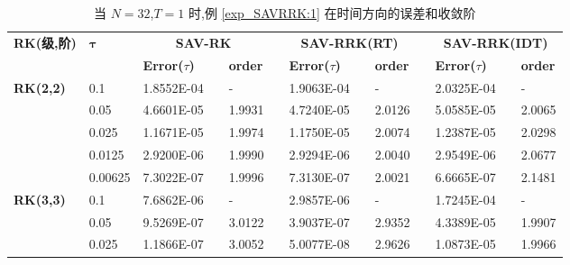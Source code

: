 \documentclass[aspectratio=169]{beamer}
\numberwithin{theorem}{section} %
\begin{document}
\begin{frame}%

	\begin{table}[H]\scriptsize
		\centering
		\caption{当 $N=32$,$T = 1$ 时,例 \ref{exp_SAVRRK:1} 在时间方向的误差和收敛阶}
		\begin{tabular}{lllllrlrlrlrlrl}
		\toprule
		\multicolumn{2}{l}{\multirow{2}[3]{*}{\textbf{RK(级,阶)}}} & \multicolumn{2}{l}{\multirow{2}[3]{*}{$\bm{\tau}$}} & \multicolumn{3}{c}{\textbf{SAV-RK}} &       & \multicolumn{3}{c}{\textbf{SAV-RRK(RT)}} &       & \multicolumn{3}{c}{\textbf{SAV-RRK(IDT)}} \\
		\cmidrule{5-7}\cmidrule{9-11}\cmidrule{13-15}    \multicolumn{2}{l}{} & \multicolumn{2}{l}{} & \textbf{Error($\tau$)} &       & \textbf{order} &       & \textbf{Error($\tau$)} &       & \textbf{order} &       & \textbf{Error($\tau$)} &       & \textbf{order} \\
		\hline
		\multicolumn{2}{l}{\multirow{5}[0]{*}{\textbf{RK(2,2)}}} & \multicolumn{2}{l}{0.1} & 1.8552E-04 &       & -     &       & 1.9063E-04 &       & -     &       & 2.0325E-04 &       & - \\
		\multicolumn{2}{l}{} & \multicolumn{2}{l}{0.05} & 4.6601E-05 &       & 1.9931  &       & 4.7240E-05 &       & 2.0126  &       & 5.0585E-05 &       & 2.0065  \\
		\multicolumn{2}{l}{} & \multicolumn{2}{l}{0.025} & 1.1671E-05 &       & 1.9974  &       & 1.1750E-05 &       & 2.0074  &       & 1.2387E-05 &       & 2.0298  \\
		\multicolumn{2}{l}{} & \multicolumn{2}{l}{0.0125} & 2.9200E-06 &       & 1.9990  &       & 2.9294E-06 &       & 2.0040  &       & 2.9549E-06 &       & 2.0677  \\
		\multicolumn{2}{l}{} & \multicolumn{2}{l}{0.00625} & 7.3022E-07 &       & 1.9996  &       & 7.3130E-07 &       & 2.0021  &       & 6.6665E-07 &       & 2.1481  \\
		\multicolumn{2}{l}{\multirow{5}[0]{*}{\textbf{RK(3,3)}}} & \multicolumn{2}{l}{0.1} & 7.6862E-06 &       & -     &       & 2.9857E-06 &       & -     &       & 1.7245E-04 &       & - \\
		\multicolumn{2}{l}{} & \multicolumn{2}{l}{0.05} & 9.5269E-07 &       & 3.0122  &       & 3.9037E-07 &       & 2.9352  &       & 4.3389E-05 &       & 1.9907  \\
		\multicolumn{2}{l}{} & \multicolumn{2}{l}{0.025} & 1.1866E-07 &       & 3.0052  &       & 5.0077E-08 &       & 2.9626  &       & 1.0873E-05 &       & 1.9966  \\

\end{tabular}
\end{table}
\end{frame}
\end{document}
